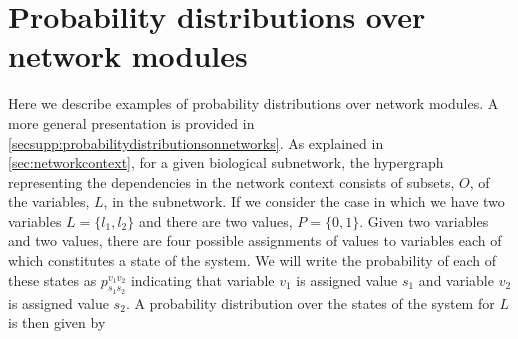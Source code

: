 
\section{Probability distributions over network modules}\label{sec:probabilitydistributionsonnetworks}
Here we describe examples of probability distributions over network modules. A more general presentation is provided in  \ref{secsupp:probabilitydistributionsonnetworks}.
As explained in \ref{sec:networkcontext}, for a given biological subnetwork, the hypergraph representing the dependencies in the network context consists of subsets, $O$, of the variables, $L$, in the subnetwork.
If we consider the case in which we have two variables $L=\{l_1,l_2\}$ and there are two values, $P=\{0,1\}$. Given two variables and two values, there are four possible assignments of values to variables each of which constitutes a state of the system. We will write the probability of each of these states as $p^{v_1v_2}_{s_1s_2}$ indicating that variable $v_1$ is assigned value $s_1$ and variable $v_2$ is assigned value $s_2$. A probability distribution over the states of the system for $L$ is then given by
